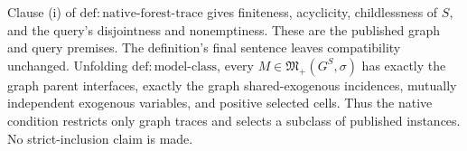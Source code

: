 Clause (i) of \(\mathrm{def:native\text{-}forest\text{-}trace}\) gives finiteness, acyclicity, childlessness of \(S\), and the query's disjointness and nonemptiness. These are the published graph and query premises. The definition's final sentence leaves compatibility unchanged. Unfolding \(\mathrm{def:model\text{-}class}\), every \(M\in\mathfrak M_+(G^S,\sigma)\) has exactly the graph parent interfaces, exactly the graph shared-exogenous incidences, mutually independent exogenous variables, and positive selected cells. Thus the native condition restricts only graph traces and selects a subclass of published instances. No strict-inclusion claim is made.